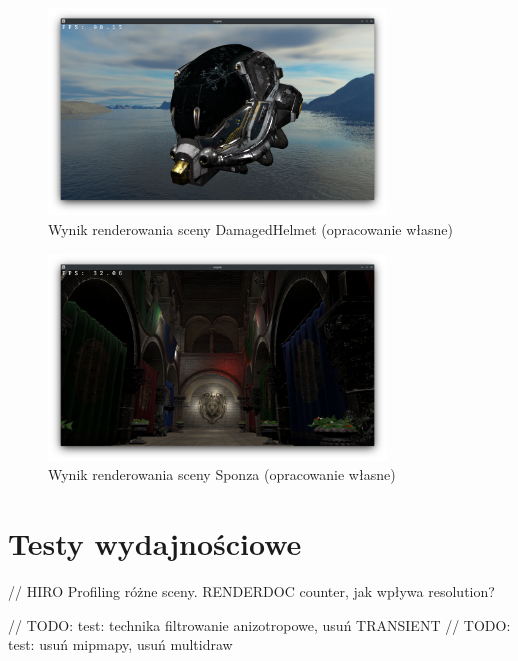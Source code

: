 \begin{figure}[!htb]
	\centering
	\includegraphics[width=0.8\textwidth]{images/render_damagedhelmet.png}
	\caption{Wynik renderowania sceny DamagedHelmet (opracowanie własne)}
	\label{screenshot_damagedhelmet}
\end{figure}

\begin{figure}[!htb]
	\centering
	\includegraphics[width=0.8\textwidth]{images/render_sponza.png}
	\caption{Wynik renderowania sceny Sponza (opracowanie własne)}
	\label{screenshot_sponza}
\end{figure}

\section{Testy wydajnościowe}

// HIRO Profiling różne sceny. RENDERDOC counter, jak wpływa resolution?

// TODO: test: technika filtrowanie anizotropowe, usuń TRANSIENT
// TODO: test: usuń mipmapy, usuń multidraw
